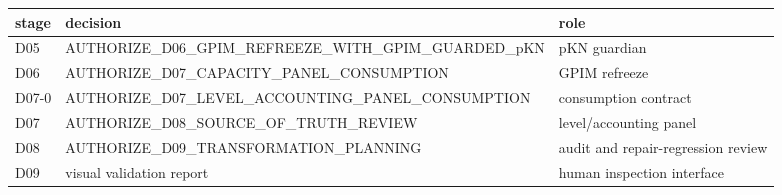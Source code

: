 
\begin{tabular}{lll}
\toprule
stage & decision & role\\
\midrule
D05 & AUTHORIZE\_D06\_GPIM\_REFREEZE\_WITH\_GPIM\_GUARDED\_pKN & pKN guardian\\
D06 & AUTHORIZE\_D07\_CAPACITY\_PANEL\_CONSUMPTION & GPIM refreeze\\
D07-0 & AUTHORIZE\_D07\_LEVEL\_ACCOUNTING\_PANEL\_CONSUMPTION & consumption contract\\
D07 & AUTHORIZE\_D08\_SOURCE\_OF\_TRUTH\_REVIEW & level/accounting panel\\
D08 & AUTHORIZE\_D09\_TRANSFORMATION\_PLANNING & audit and repair-regression review\\
\addlinespace
D09 & visual validation report & human inspection interface\\
\bottomrule
\end{tabular}
